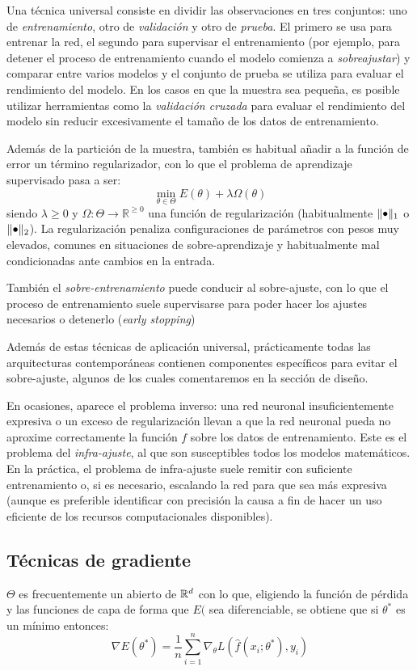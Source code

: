 Una técnica universal consiste en dividir las observaciones en tres conjuntos: uno de \textit{entrenamiento}, otro de \textit{validación} y otro de \textit{prueba}. El primero se usa para entrenar la red, el segundo para supervisar el entrenamiento (por ejemplo, para detener el proceso de entrenamiento cuando el modelo comienza a \textit{sobreajustar}) y comparar entre varios modelos y el conjunto de prueba se utiliza para evaluar el rendimiento del modelo. En los casos en que la muestra sea pequeña, es posible utilizar herramientas como la \textit{validación cruzada} para evaluar el rendimiento del modelo sin reducir excesivamente el tamaño de los datos de entrenamiento. 

Además de la partición de la muestra, también es habitual añadir a la función de error un término regularizador, con lo que el problema de aprendizaje supervisado pasa a ser:
\[
    \min_{\theta \in \Theta} E(\theta) + \lambda \Omega(\theta)
\]
siendo \( \lambda \geq 0 \) y \( \Omega \colon \Theta \to \mathbb{R}^{\geq 0} \)  una función de regularización (habitualmente \( \| \smallbullet \|_{1} \) o \( \| \smallbullet \|_{2} \)). La regularización penaliza configuraciones de parámetros con pesos muy elevados, comunes en situaciones de sobre-aprendizaje y habitualmente mal condicionadas ante cambios en la entrada.

También el \textit{sobre-entrenamiento} puede conducir al sobre-ajuste, con lo que el proceso de entrenamiento suele supervisarse para poder hacer los ajustes necesarios o detenerlo (\textit{early stopping}) 

Además de estas técnicas de aplicación universal, prácticamente todas las arquitecturas contemporáneas contienen componentes específicos para evitar el sobre-ajuste, algunos de los cuales comentaremos en la sección de diseño.

En ocasiones, aparece el problema inverso: una red neuronal insuficientemente expresiva o un exceso de regularización llevan a que la red neuronal pueda no aproxime correctamente la función \( f \) sobre los datos de entrenamiento. Este es el problema del \textit{infra-ajuste}, al que son susceptibles todos los modelos matemáticos. En la práctica, el problema de infra-ajuste suele remitir con suficiente entrenamiento o, si es necesario, escalando la red para que sea más expresiva (aunque es preferible identificar con precisión la causa a fin de hacer un uso eficiente de los recursos computacionales disponibles).

\subsection{Técnicas de gradiente}
\( \Theta \) es frecuentemente un abierto de \( \mathbb{R}^{d} \) con lo que, eligiendo la función de pérdida y las funciones de capa de forma que \( E( \) sea diferenciable, se obtiene que si \( \theta^* \) es un mínimo entonces:
\begin{equation} \label{eq:gradient}
    \nabla E(\theta^*) = \frac{1}{n} \sum_{i = 1}^n \nabla_\theta L\left( \widehat{f}(x_{i}; \theta^*), y_{i} \right)
\end{equation}


